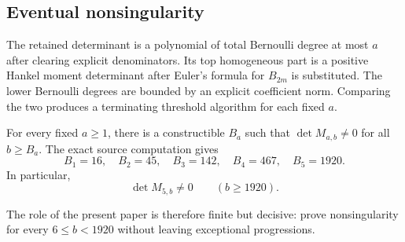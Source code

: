 \subsection{Eventual nonsingularity}

The retained determinant is a polynomial of total Bernoulli degree at
most $a$ after clearing explicit denominators.  Its top homogeneous
part is a positive Hankel moment determinant after Euler's formula for
$B_{2m}$ is substituted.  The lower Bernoulli degrees are bounded by an
explicit coefficient norm.  Comparing the two produces a terminating
threshold algorithm for each fixed $a$.

\begin{theorem}
\label{thm:eventual}
For every fixed $a\ge1$, there is a constructible $B_a$ such that
$\det M_{a,b}\ne0$ for all $b\ge B_a$.  The exact source computation
gives
\[
 B_1=16,
 \quad B_2=45,
 \quad B_3=142,
 \quad B_4=467,
 \quad B_5=1920.
\]
In particular,
\begin{equation}
 \det M_{5,b}\ne0\qquad(b\ge1920).
 \label{eq:eventual-order-ten}
\end{equation}
\end{theorem}

The role of the present paper is therefore finite but decisive: prove
nonsingularity for every $6\le b<1920$ without leaving exceptional
progressions.
